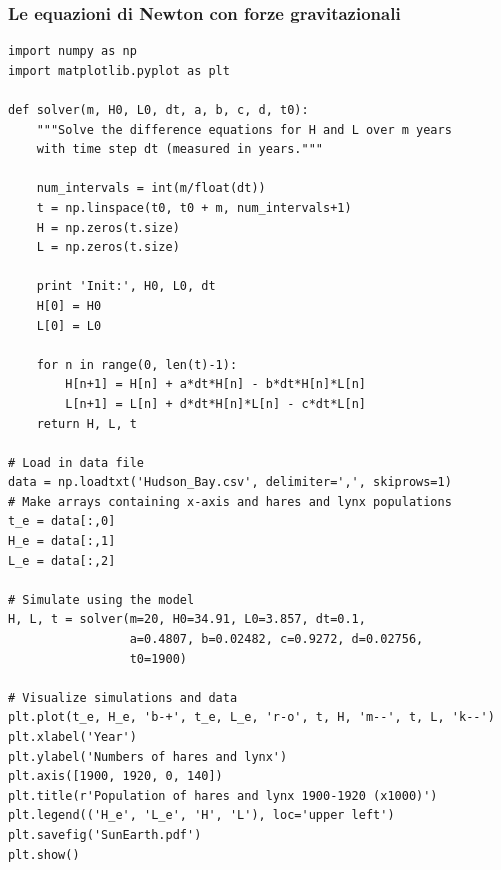\documentclass{beamer}
\begin{document}
\begin{frame}
\frametitle{Le equazioni di Newton con forze gravitazionali}

\begin{block}{}
\begin{verbatim}
import numpy as np
import matplotlib.pyplot as plt

def solver(m, H0, L0, dt, a, b, c, d, t0):
    """Solve the difference equations for H and L over m years
    with time step dt (measured in years."""

    num_intervals = int(m/float(dt))
    t = np.linspace(t0, t0 + m, num_intervals+1)
    H = np.zeros(t.size)
    L = np.zeros(t.size)

    print 'Init:', H0, L0, dt
    H[0] = H0
    L[0] = L0

    for n in range(0, len(t)-1):
        H[n+1] = H[n] + a*dt*H[n] - b*dt*H[n]*L[n]
        L[n+1] = L[n] + d*dt*H[n]*L[n] - c*dt*L[n]
    return H, L, t

# Load in data file
data = np.loadtxt('Hudson_Bay.csv', delimiter=',', skiprows=1)
# Make arrays containing x-axis and hares and lynx populations
t_e = data[:,0]
H_e = data[:,1]
L_e = data[:,2]

# Simulate using the model
H, L, t = solver(m=20, H0=34.91, L0=3.857, dt=0.1,
                 a=0.4807, b=0.02482, c=0.9272, d=0.02756,
                 t0=1900)

# Visualize simulations and data
plt.plot(t_e, H_e, 'b-+', t_e, L_e, 'r-o', t, H, 'm--', t, L, 'k--')
plt.xlabel('Year')
plt.ylabel('Numbers of hares and lynx')
plt.axis([1900, 1920, 0, 140])
plt.title(r'Population of hares and lynx 1900-1920 (x1000)')
plt.legend(('H_e', 'L_e', 'H', 'L'), loc='upper left')
plt.savefig('SunEarth.pdf')
plt.show()

\end{verbatim}
\end{block}
\end{frame}
\end{document}
